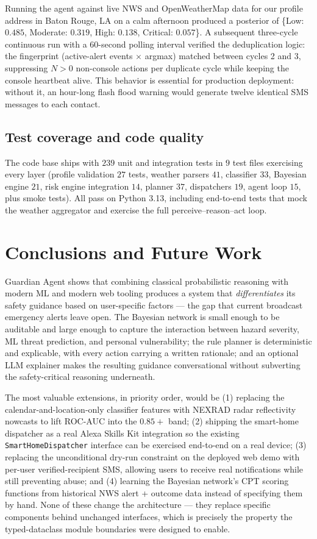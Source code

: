 \documentclass{article}
\theoremstyle{plain}
\theoremstyle{definition}
\theoremstyle{remark}
\begin{document}
Running the agent against live NWS and OpenWeatherMap data for our
profile address in Baton Rouge, LA on a calm afternoon produced a
posterior of \{Low: $0.485$, Moderate: $0.319$, High: $0.138$,
Critical: $0.057$\}. A subsequent three-cycle continuous run with a
60-second polling interval verified the deduplication logic: the
fingerprint (active-alert events $\times$ argmax) matched between
cycles 2 and 3, suppressing $N \!>\! 0$ non-console actions per
duplicate cycle while keeping the console heartbeat alive. This
behavior is essential for production deployment: without it, an
hour-long flash flood warning would generate twelve identical SMS
messages to each contact.

\subsection{Test coverage and code quality}

The code base ships with $239$ unit and integration tests in $9$ test
files exercising every layer (profile validation $27$ tests, weather
parsers $41$, classifier $33$, Bayesian engine $21$, risk engine
integration $14$, planner $37$, dispatchers $19$, agent loop $15$,
plus smoke tests). All pass on Python 3.13, including end-to-end
tests that mock the weather aggregator and exercise the full
perceive--reason--act loop.

\section{Conclusions and Future Work}
\label{sec:conclusion}

Guardian Agent shows that combining classical probabilistic reasoning
with modern ML and modern web tooling produces a system that
\emph{differentiates} its safety guidance based on user-specific
factors --- the gap that current broadcast emergency alerts leave
open. The Bayesian network is small enough to be auditable and large
enough to capture the interaction between hazard severity, ML threat
prediction, and personal vulnerability; the rule planner is
deterministic and explicable, with every action carrying a written
rationale; and an optional LLM explainer makes the resulting
guidance conversational without subverting the safety-critical
reasoning underneath.

The most valuable extensions, in priority order, would be
(1) replacing the calendar-and-location-only classifier features with
NEXRAD radar reflectivity nowcasts to lift ROC-AUC into the
$0.85\!+$ band; (2) shipping the smart-home dispatcher as a real
Alexa Skills Kit integration so the existing
\texttt{SmartHomeDispatcher} interface can be exercised end-to-end on
a real device; (3) replacing the unconditional dry-run constraint on
the deployed web demo with per-user verified-recipient SMS, allowing
users to receive real notifications while still preventing abuse; and
(4) learning the Bayesian network's CPT scoring functions from
historical NWS alert + outcome data instead of specifying them by
hand. None of these change the architecture --- they replace specific
components behind unchanged interfaces, which is precisely the
property the typed-dataclass module boundaries were designed to
enable.



\end{document}
